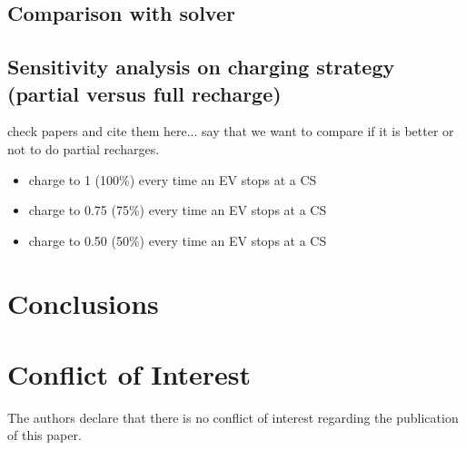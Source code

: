 \documentclass[11pt]{article}
\begin{document}
\subsection{Comparison with solver}

\subsection{Sensitivity analysis on charging strategy (partial versus full recharge)}
check papers and cite them here... say that we want to compare if it is better or not to do partial recharges.
\begin{itemize}
	\item charge to 1 (100\%) every time an EV stops at a CS
	\item charge to 0.75 (75\%) every time an EV stops at a CS
	\item charge to 0.50 (50\%) every time an EV stops at a CS
\end{itemize}


\section{Conclusions}
\label{section:conclusion}

\section*{Conflict of Interest}
\label{section:Conflict}

The authors declare that there is no conflict of interest regarding the publication of this paper.





\end{document}
